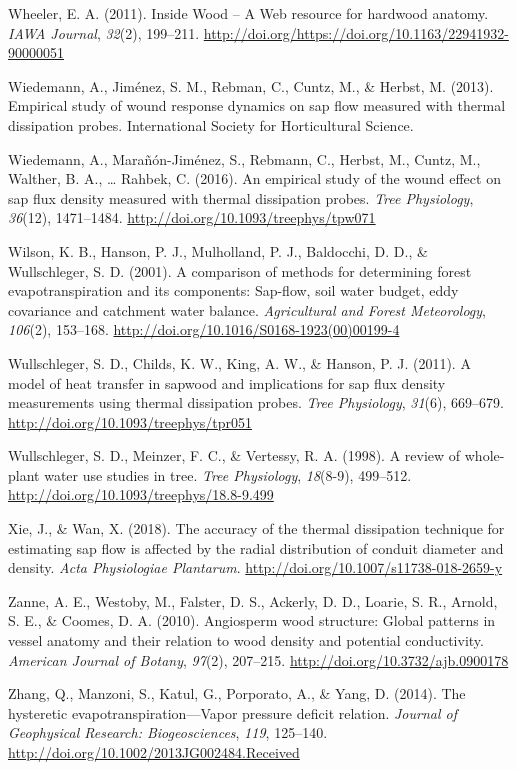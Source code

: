\documentclass[11pt,twoside]{reedthesis}
\begin{document}
\hypertarget{ref-insidewood}{}
Wheeler, E. A. (2011). Inside Wood -- A Web resource for hardwood
anatomy. \emph{IAWA Journal}, \emph{32}(2), 199--211.
\url{http://doi.org/https://doi.org/10.1163/22941932-90000051}

\hypertarget{ref-Wiedemann2013}{}
Wiedemann, A., Jiménez, S. M., Rebman, C., Cuntz, M., \& Herbst, M.
(2013). Empirical study of wound response dynamics on sap flow measured
with thermal dissipation probes. International Society for Horticultural
Science.

\hypertarget{ref-Wiedemann2016}{}
Wiedemann, A., Marañón-Jiménez, S., Rebmann, C., Herbst, M., Cuntz, M.,
Walther, B. A., \ldots{} Rahbek, C. (2016). An empirical study of the
wound effect on sap flux density measured with thermal dissipation
probes. \emph{Tree Physiology}, \emph{36}(12), 1471--1484.
\url{http://doi.org/10.1093/treephys/tpw071}

\hypertarget{ref-Wilson2001}{}
Wilson, K. B., Hanson, P. J., Mulholland, P. J., Baldocchi, D. D., \&
Wullschleger, S. D. (2001). A comparison of methods for determining
forest evapotranspiration and its components: Sap-flow, soil water
budget, eddy covariance and catchment water balance. \emph{Agricultural
and Forest Meteorology}, \emph{106}(2), 153--168.
\url{http://doi.org/10.1016/S0168-1923(00)00199-4}

\hypertarget{ref-Wullschleger2011}{}
Wullschleger, S. D., Childs, K. W., King, A. W., \& Hanson, P. J.
(2011). A model of heat transfer in sapwood and implications for sap
flux density measurements using thermal dissipation probes. \emph{Tree
Physiology}, \emph{31}(6), 669--679.
\url{http://doi.org/10.1093/treephys/tpr051}

\hypertarget{ref-Wullschleger1998}{}
Wullschleger, S. D., Meinzer, F. C., \& Vertessy, R. A. (1998). A review
of whole-plant water use studies in tree. \emph{Tree Physiology},
\emph{18}(8-9), 499--512.
\url{http://doi.org/10.1093/treephys/18.8-9.499}

\hypertarget{ref-Xie2018}{}
Xie, J., \& Wan, X. (2018). The accuracy of the thermal dissipation
technique for estimating sap flow is affected by the radial distribution
of conduit diameter and density. \emph{Acta Physiologiae Plantarum}.
\url{http://doi.org/10.1007/s11738-018-2659-y}

\hypertarget{ref-Zanne2010}{}
Zanne, A. E., Westoby, M., Falster, D. S., Ackerly, D. D., Loarie, S.
R., Arnold, S. E., \& Coomes, D. A. (2010). Angiosperm wood structure:
Global patterns in vessel anatomy and their relation to wood density and
potential conductivity. \emph{American Journal of Botany}, \emph{97}(2),
207--215. \url{http://doi.org/10.3732/ajb.0900178}

\hypertarget{ref-Zhang2014}{}
Zhang, Q., Manzoni, S., Katul, G., Porporato, A., \& Yang, D. (2014).
The hysteretic evapotranspiration---Vapor pressure deficit relation.
\emph{Journal of Geophysical Research: Biogeosciences}, \emph{119},
125--140. \url{http://doi.org/10.1002/2013JG002484.Received}


\end{document}
